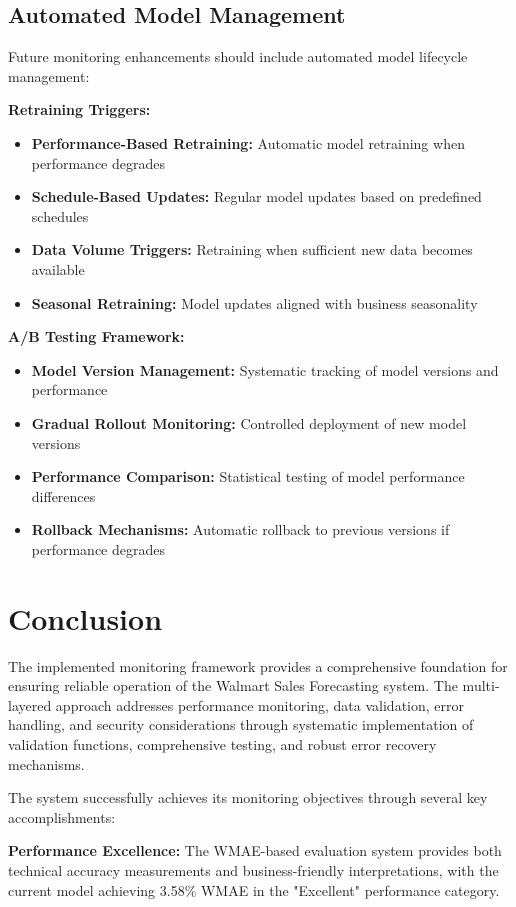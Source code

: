 \subsection{Automated Model Management}

Future monitoring enhancements should include automated model lifecycle management:

\textbf{Retraining Triggers:}
\begin{itemize}
	\item \textbf{Performance-Based Retraining:} Automatic model retraining when performance degrades
	\item \textbf{Schedule-Based Updates:} Regular model updates based on predefined schedules
	\item \textbf{Data Volume Triggers:} Retraining when sufficient new data becomes available
	\item \textbf{Seasonal Retraining:} Model updates aligned with business seasonality
\end{itemize}

\textbf{A/B Testing Framework:}
\begin{itemize}
	\item \textbf{Model Version Management:} Systematic tracking of model versions and performance
	\item \textbf{Gradual Rollout Monitoring:} Controlled deployment of new model versions
	\item \textbf{Performance Comparison:} Statistical testing of model performance differences
	\item \textbf{Rollback Mechanisms:} Automatic rollback to previous versions if performance degrades
\end{itemize}

\section{Conclusion}

The implemented monitoring framework provides a comprehensive foundation for ensuring reliable operation of the Walmart Sales Forecasting system. The multi-layered approach addresses performance monitoring, data validation, error handling, and security considerations through systematic implementation of validation functions, comprehensive testing, and robust error recovery mechanisms.

The system successfully achieves its monitoring objectives through several key accomplishments:

\textbf{Performance Excellence:} The WMAE-based evaluation system provides both technical accuracy measurements and business-friendly interpretations, with the current model achieving 3.58\% WMAE in the "Excellent" performance category.

